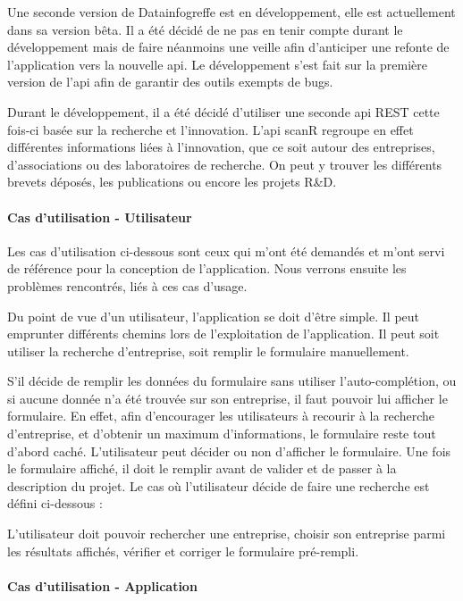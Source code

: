 \documentclass[french]{article}
\begin{document}
{Une seconde version de Datainfogreffe est en développement, elle est actuellement dans sa version bêta. Il a été décidé de ne pas en tenir compte durant le développement mais de faire néanmoins une veille afin d'anticiper une refonte de l'application vers la nouvelle api. Le développement s'est fait sur la première version de l'api afin de garantir des outils exempts de bugs.

Durant le développement, il a été décidé d'utiliser une seconde api REST cette fois-ci basée sur la recherche et l'innovation. L'api scanR regroupe en effet différentes informations liées à l'innovation, que ce soit autour des entreprises, d'associations ou des laboratoires de recherche. On peut y trouver les différents brevets déposés, les publications ou encore les projets R\&D. \cite{scanr}

\paragraph{Cas d'utilisation - Utilisateur}

Les cas d'utilisation ci-dessous sont ceux qui m'ont été demandés et m'ont servi de référence pour la conception de l'application. Nous verrons ensuite les problèmes rencontrés, liés à ces cas d'usage.

Du point de vue d'un utilisateur, l'application se doit d'être simple. Il peut emprunter différents chemins lors de l'exploitation de l'application. Il peut soit utiliser la recherche d'entreprise, soit remplir le formulaire manuellement.

S'il décide de remplir les données du formulaire sans utiliser l'auto-complétion, ou si aucune donnée n'a été trouvée sur son entreprise, il faut pouvoir lui afficher le formulaire. En effet, afin d'encourager les utilisateurs à recourir à la recherche d'entreprise, et d'obtenir un maximum d'informations, le formulaire reste tout d'abord caché. L'utilisateur peut décider ou non d'afficher le formulaire. Une fois le formulaire affiché, il doit le remplir avant de valider et de passer à la description du projet. Le cas où l'utilisateur décide de faire une recherche est défini ci-dessous :

L'utilisateur doit pouvoir rechercher une entreprise, choisir son entreprise parmi les résultats affichés, vérifier et corriger le formulaire pré-rempli. 

\paragraph{Cas d'utilisation - Application}

}
\end{document}
